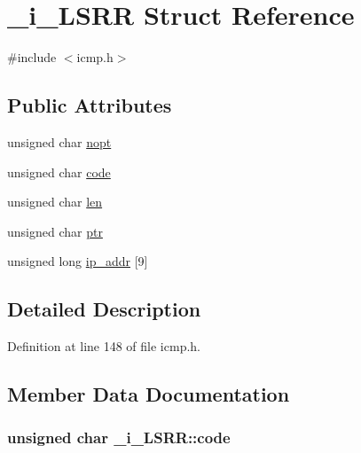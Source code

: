 \hypertarget{struct__i___l_s_r_r}{\section{\-\_\-i\-\_\-\-L\-S\-R\-R \-Struct \-Reference}
\label{struct__i___l_s_r_r}
}


{\ttfamily \#include $<$icmp.\-h$>$}

\subsection*{\-Public \-Attributes}
\begin{DoxyCompactItemize}
\item 
unsigned char \hyperlink{struct__i___l_s_r_r_aad13e1c6b3e57d77d23b25e471fa2aa3}{nopt}
\item 
unsigned char \hyperlink{struct__i___l_s_r_r_a39ee908b8faffbb51d79167feb00ab1d}{code}
\item 
unsigned char \hyperlink{struct__i___l_s_r_r_aa5d72bf53e859cbc812ab4eb2e6a1e10}{len}
\item 
unsigned char \hyperlink{struct__i___l_s_r_r_a8168ba0b7152490ed235abe4030669bd}{ptr}
\item 
unsigned long \hyperlink{struct__i___l_s_r_r_a35227f253385efe3447285b9fadfacbb}{ip\-\_\-addr} \mbox{[}9\mbox{]}
\end{DoxyCompactItemize}


\subsection{\-Detailed \-Description}


\-Definition at line 148 of file icmp.\-h.



\subsection{\-Member \-Data \-Documentation}
\hypertarget{struct__i___l_s_r_r_a39ee908b8faffbb51d79167feb00ab1d}{
\subsubsection[{code}]{\setlength{\rightskip}{0pt plus 5cm}unsigned char {\bf \-\_\-i\-\_\-\-L\-S\-R\-R\-::code}}}\label{struct__i___l_s_r_r_a39ee908b8faffbb51d79167feb00ab1d}


